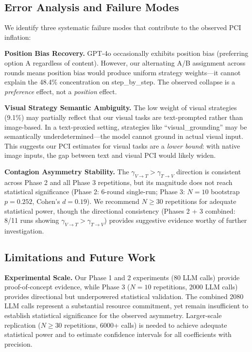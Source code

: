 \documentclass[11pt,a4paper]{article}
\begin{document}
\subsection{Error Analysis and Failure Modes}

We identify three systematic failure modes that contribute to the observed PCI inflation:

\textbf{Position Bias Recovery.} GPT-4o occasionally exhibits position bias (preferring option A regardless of content). However, our alternating A/B assignment across rounds means position bias would produce uniform strategy weights---it cannot explain the 48.4\% concentration on step\_by\_step. The observed collapse is a \textit{preference} effect, not a \textit{position} effect.

\textbf{Visual Strategy Semantic Ambiguity.} The low weight of visual strategies (9.1\%) may partially reflect that our visual tasks are text-prompted rather than image-based. In a text-proxied setting, strategies like ``visual\_grounding'' may be semantically underdetermined---the model cannot ground in actual visual input. This suggests our PCI estimates for visual tasks are a \textit{lower bound}: with native image inputs, the gap between text and visual PCI would likely widen.

\textbf{Contagion Asymmetry Stability.} The $\gamma_{V\to T} > \gamma_{T\to V}$ direction is consistent across Phase 2 and all Phase 3 repetitions, but its magnitude does not reach statistical significance (Phase 2: 6-round single-run; Phase 3: $N=10$ bootstrap $p=0.252$, Cohen's $d=0.19$). We recommend $N \geq 30$ repetitions for adequate statistical power, though the directional consistency (Phases 2 + 3 combined: 8/11 runs showing $\gamma_{V\to T} > \gamma_{T\to V}$) provides suggestive evidence worthy of further investigation.

\subsection{Limitations and Future Work}

\textbf{Experimental Scale.} Our Phase 1 and 2 experiments (80 LLM calls) provide proof-of-concept evidence, while Phase 3 ($N=10$ repetitions, 2000 LLM calls) provides directional but underpowered statistical validation. The combined 2080 LLM calls represent a substantial resource commitment, yet remain insufficient to establish statistical significance for the observed asymmetry. Larger-scale replication ($N \geq 30$ repetitions, 6000+ calls) is needed to achieve adequate statistical power and to estimate confidence intervals for all coefficients with precision.
\end{document}
